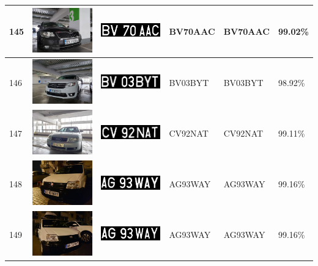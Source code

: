 \documentclass[a4paper,12pt]{report}
\begin{document}
\begin{longtable}{| m{0.6cm} | m{3cm} | m{3cm} | m{1.8cm} | m{1.8cm} | m{1.8cm} |}
        145 & \includegraphics[width=3cm,keepaspectratio]{dataset/84_s1.jpg} & \includegraphics[width=3cm,keepaspectratio]{segmentari/145.jpg} & BV70AAC & BV70AAC & 99.02\% \\ \hline
        146 & \includegraphics[width=3cm,keepaspectratio]{dataset/85_d1.jpg} & \includegraphics[width=3cm,keepaspectratio]{segmentari/146.jpg} & BV03BYT & BV03BYT & 98.92\% \\ \hline
        147 & \includegraphics[width=3cm,keepaspectratio]{dataset/86_d1.jpg} & \includegraphics[width=3cm,keepaspectratio]{segmentari/147.jpg} & CV92NAT & CV92NAT & 99.11\% \\ \hline
        148 & \includegraphics[width=3cm,keepaspectratio]{dataset/87_d1.jpg} & \includegraphics[width=3cm,keepaspectratio]{segmentari/148.jpg} & AG93WAY & AG93WAY & 99.16\% \\ \hline
        149 & \includegraphics[width=3cm,keepaspectratio]{dataset/87_s1.jpg} & \includegraphics[width=3cm,keepaspectratio]{segmentari/149.jpg} & AG93WAY & AG93WAY & 99.16\% \\ \hline

\end{longtable}
\end{document}
